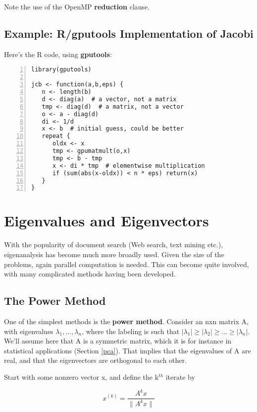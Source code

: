 Note the use of the OpenMP {\bf reduction} clause.

\subsection{Example:  R/gputools Implementation of Jacobi}

Here's the R code, using {\bf gputools}:

\begin{lstlisting}[numbers=left]
library(gputools)

jcb <- function(a,b,eps) {
   n <- length(b)
   d <- diag(a)  # a vector, not a matrix
   tmp <- diag(d)  # a matrix, not a vector
   o <- a - diag(d)
   di <- 1/d
   x <- b  # initial guess, could be better
   repeat {
      oldx <- x
      tmp <- gpumatmult(o,x)
      tmp <- b - tmp
      x <- di * tmp  # elementwise multiplication
      if (sum(abs(x-oldx)) < n * eps) return(x)
   }
}
\end{lstlisting}

\section{Eigenvalues and Eigenvectors}
\label{eigen}

With the popularity of document search (Web search, text mining etc.),
eigenanalysis has become much more broadly used.  Given the size of the
problems, again parallel computation is needed.
This can become quite involved, with many complicated methods having
been developed.

\subsection{The Power Method}

One of the simplest methods is the {\bf power method}.  Consider an nxn
matrix A, with eigenvalues $\lambda_1,...,\lambda_n$, where the labeling
is such that $|\lambda_1| \geq |\lambda_2| \geq ...  \geq |\lambda_n|$.
We'll assume here that A is a symmetric matrix, which it is for instance
in statistical applications (Section \ref{pca}).  That implies that the
eigenvalues of A are real, and that the eigenvectors are orthogonal to
each other.

Start with some nonzero vector x, and define the k$^{th}$ iterate by

\begin{equation}
\label{xkeqn}
x^{(k)} = \frac{A^k x}{\parallel A^k x \parallel}
\end{equation}

